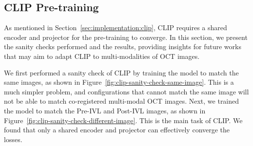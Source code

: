\documentclass[a4paper,11pt,oneside]{report}
\begin{document}
\subsection{CLIP Pre-training}\label{sec:results:discussion:clip}
As mentioned in Section~\ref{sec:implementation:clip}, CLIP requires a shared encoder and projector for the pre-training to converge. In this section, we present the sanity checks performed and the results, providing insights for future works that may aim to adapt CLIP to multi-modalities of OCT images.

We first performed a sanity check of CLIP by training the model to match the same images, as shown in Figure~\ref{fig:clip-sanity-check-same-image}. This is a much simpler problem, and configurations that cannot match the same image will not be able to match co-registered multi-modal OCT images. Next, we trained the model to match the Pre-IVL and Post-IVL images, as shown in Figure~\ref{fig:clip-sanity-check-different-image}. This is the main task of CLIP. We found that only a shared encoder and projector can effectively converge the losses.
\end{document}
